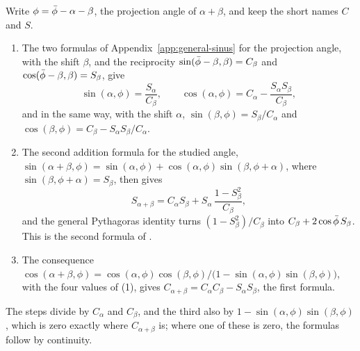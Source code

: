 \begin{remark}\label{rem:gn-addition-from-a}
Write $\phi = \bar{\phi} - \alpha - \beta$, the projection angle of $\alpha + \beta$, and keep the short names $C$ and $S$.
\begin{enumerate}
  \item The two formulas of Appendix~\ref{app:general-sinus} for the projection angle, with the shift $\beta$, and the reciprocity $\sin(\bar{\phi} - \beta, \beta) = C_\beta$ and $\cos(\bar{\phi} - \beta, \beta) = S_\beta$, give
  \[
  \sin(\alpha, \phi) = \frac{S_\alpha}{C_\beta} , \qquad \cos(\alpha, \phi) = C_\alpha - \frac{S_\alpha S_\beta}{C_\beta} ,
  \]
  and in the same way, with the shift $\alpha$, $\sin(\beta, \phi) = S_\beta/C_\alpha$ and $\cos(\beta, \phi) = C_\beta - S_\alpha S_\beta/C_\alpha$.
  \item The second addition formula for the studied angle, $\sin(\alpha + \beta, \phi) = \sin(\alpha, \phi) + \cos(\alpha, \phi)\sin(\beta, \phi + \alpha)$, where $\sin(\beta, \phi + \alpha) = S_\beta$, then gives
  \[
  S_{\alpha + \beta} = C_\alpha S_\beta + S_\alpha\,\frac{1 - S_\beta^2}{C_\beta} ,
  \]
  and the general Pythagoras identity turns $(1 - S_\beta^2)/C_\beta$ into $C_\beta + 2\cos\bar{\phi}\,S_\beta$. This is the second formula of .
  \item The consequence $\cos(\alpha + \beta, \phi) = \cos(\alpha, \phi)\cos(\beta, \phi)/\bigl(1 - \sin(\alpha, \phi)\sin(\beta, \phi)\bigr)$, with the four values of (1), gives $C_{\alpha + \beta} = C_\alpha C_\beta - S_\alpha S_\beta$, the first formula.
\end{enumerate}
The steps divide by $C_\alpha$ and $C_\beta$, and the third also by $1 - \sin(\alpha, \phi)\sin(\beta, \phi)$, which is zero exactly where $C_{\alpha + \beta}$ is; where one of these is zero, the formulas follow by continuity.
\end{remark}

